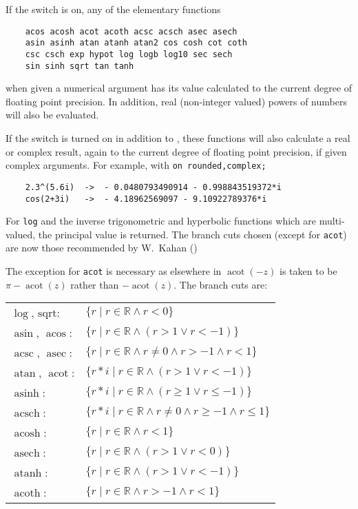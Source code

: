 If the switch  is on, any of the
elementary functions
\begin{verbatim}
    acos acosh acot acoth acsc acsch asec asech
    asin asinh atan atanh atan2 cos cosh cot coth
    csc csch exp hypot log logb log10 sec sech
    sin sinh sqrt tan tanh
\end{verbatim}
when given a numerical argument has its value calculated to the current
degree of floating point precision.  In addition, real (non-integer
valued) powers of numbers will also be evaluated.

If the  switch is turned on in addition to ,
these functions will also calculate a real or complex result, again to
the current degree of floating point precision,
if given complex arguments.  For example, with \texttt{on rounded,complex;}
\begin{verbatim}
    2.3^(5.6i)  ->  - 0.0480793490914 - 0.998843519372*i
    cos(2+3i)   ->  - 4.18962569097 - 9.10922789376*i
\end{verbatim}

For \texttt{log} and the inverse trigonometric and hyperbolic functions which are
multi-valued, the principal value is returned. The branch cuts chosen
(except for \texttt{acot}) are now
those recommended by W.~Kahan (\cite{Kahan1987BranchCF})

The exception for \texttt{acot} is necessary as elsewhere in {\REDUCE}
$\mathop{\mathrm{acot}}(-z)$ is taken to be $\pi - \mathop{\mathrm{acot}}(z)$
rather than $-\mathop{\mathrm{acot}}(z)$.
The branch cuts are:\\
\begin{tabular}{ll}
  $\log$, $\mathrm{sqrt}$:     & $ \{r   \mid r \in\mathbb{R} \land r < 0\} $\\
  $\mathop{\mathrm{asin}}$, $\mathop{\mathrm{acos}}$: & $ \{r   \mid r \in\mathbb{R} \land (r > 1 \lor r < -1)\} $\\
  $\mathop{\mathrm{acsc}}$, $\mathop{\mathrm{asec}}$: & $ \{r   \mid r \in\mathbb{R} \land r \neq 0 \land r > -1 \land r < 1\} $\\
  $\mathop{\mathrm{atan}}$, $\mathop{\mathrm{acot}}$: & $ \{r*i \mid r \in\mathbb{R} \land (r > 1 \lor r < -1)\} $\\
  $\mathop{\mathrm{asinh}}$:         & $ \{r*i \mid r \in\mathbb{R} \land (r \geq  1 \lor r \leq  -1)\} $\\
  $\mathop{\mathrm{acsch}}$:         & $ \{r*i \mid r \in\mathbb{R} \land r \neq 0 \land r \geq  -1 \land r \leq  1\} $\\
  $\mathop{\mathrm{acosh}}$:         & $ \{r   \mid r \in\mathbb{R} \land r < 1\} $\\
  $\mathop{\mathrm{asech}}$:         & $ \{r   \mid r \in\mathbb{R} \land (r > 1 \lor r < 0)\} $\\
  $\mathop{\mathrm{atanh}}$:         & $ \{r   \mid r \in\mathbb{R} \land (r > 1 \lor r < -1)\} $\\
  $\mathop{\mathrm{acoth}}$:         & $ \{r   \mid r \in\mathbb{R} \land r > -1 \land r < 1\} $
\end{tabular}


